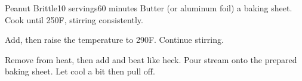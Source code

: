 \documentclass[../Cookbook.tex]{subfiles}
\begin{document}
\begin{recipe}[PeanutBrittle]{Peanut Brittle}{10 servings}{60 minutes}
Butter (or aluminum foil) a baking sheet.
Cook until 250\0F, stirring consistently.

Add, then raise the temperature to 290\0F. Continue stirring.
 
Remove from heat, then add and beat like heck.
Pour stream onto the prepared baking sheet. Let cool a bit then pull off.
\end{recipe}
\end{document}
